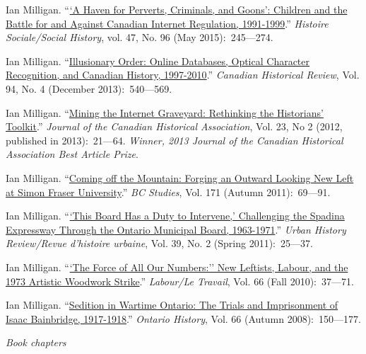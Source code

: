 \documentclass[11pt,article,oneside]{memoir}
\begin{document}
\ind Ian Milligan. ``\href{http://muse.jhu.edu/login?auth=0&type=summary&url=/journals/histoire_sociale_social_history/v048/48.96.milligan.pdf}{`A Haven for Perverts, Criminals, and Goons': Children and the Battle for and Against Canadian Internet Regulation, 1991-1999}.'' \emph{Histoire Sociale/Social History}, vol. 47, No. 96 (May 2015):~245---274.

\ind Ian Milligan. ``\href{http://muse.jhu.edu/journals/canadian_historical_review/toc/can.94.4.html}{Illusionary Order: Online Databases, Optical Character Recognition, and Canadian History, 1997-2010}.'' \emph{Canadian Historical Review}, Vol. 94, No. 4 (December 2013):~540---569.

\ind Ian Milligan. ``\href{http://www.erudit.org/revue/jcha/2012/v23/n2/1015788ar.html}{Mining the Internet Graveyard: Rethinking the Historians' Toolkit}.'' \emph{Journal of the Canadian Historical Association}, Vol. 23, No 2 (2012, published in 2013):~21---64. \textit{Winner, 2013 Journal of the Canadian Historical Association Best Article Prize}.

\ind Ian Milligan. ``\href{http://ojs.library.ubc.ca/index.php/bcstudies/article/view/2046}{Coming off the Mountain: Forging an Outward Looking New Left at Simon Fraser University}.'' \emph{BC Studies}, Vol. 171 (Autumn 2011):~69---91.

\ind Ian Milligan. ``\href{https://ianmilligan.ca/2013/06/17/post-firewall-this-board-has-a-duty-to-intervene/}{`This Board Has a Duty to Intervene,' Challenging the Spadina Expressway Through the Ontario Municipal Board, 1963-1971}.'' \emph{Urban History Review/Revue d'histoire urbaine}, Vol. 39, No. 2 (Spring 2011):~25---37.

\ind Ian Milligan. ``\href{http://www.lltjournal.ca/index.php/llt/article/download/5613/6476}{`The Force of All Our Numbers:'' New Leftists, Labour, and the 1973 Artistic Woodwork Strike}.'' \emph{Labour/Le Travail}, Vol. 66 (Fall 2010):~37---71.

\ind Ian Milligan. ``\href{http://search.proquest.com.proxy.lib.uwaterloo.ca/docview/208529434?accountid=14906}{Sedition in Wartime Ontario: The Trials and Imprisonment of Isaac Bainbridge, 1917-1918}.'' \emph{Ontario History}, Vol. 66 (Autumn 2008):~150---177.

\bigskip

\noindent\emph{Book chapters \vspace{0.05in}}
\end{document}
